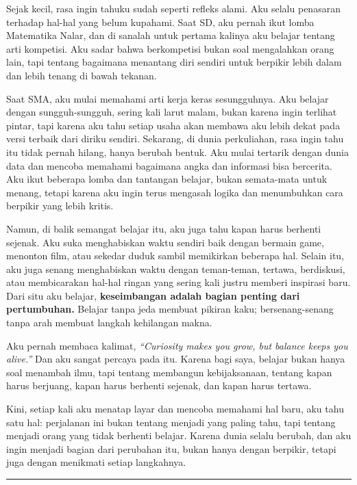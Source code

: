 \documentclass[
  letterpaper,
  DIV=11,
  numbers=noendperiod]{scrreprt}
\begin{document}
Sejak kecil, rasa ingin tahuku sudah seperti refleks alami. Aku selalu
penasaran terhadap hal-hal yang belum kupahami. Saat SD, aku pernah ikut
lomba Matematika Nalar, dan di sanalah untuk pertama kalinya aku belajar
tentang arti kompetisi. Aku sadar bahwa berkompetisi bukan soal
mengalahkan orang lain, tapi tentang bagaimana menantang diri sendiri
untuk berpikir lebih dalam dan lebih tenang di bawah tekanan.

Saat SMA, aku mulai memahami arti kerja keras sesungguhnya. Aku belajar
dengan sungguh-sungguh, sering kali larut malam, bukan karena ingin
terlihat pintar, tapi karena aku tahu setiap usaha akan membawa aku
lebih dekat pada versi terbaik dari diriku sendiri. Sekarang, di dunia
perkuliahan, rasa ingin tahu itu tidak pernah hilang, hanya berubah
bentuk. Aku mulai tertarik dengan dunia data dan mencoba memahami
bagaimana angka dan informasi bisa bercerita. Aku ikut beberapa lomba
dan tantangan belajar, bukan semata-mata untuk menang, tetapi karena aku
ingin terus mengasah logika dan menumbuhkan cara berpikir yang lebih
kritis.

Namun, di balik semangat belajar itu, aku juga tahu kapan harus berhenti
sejenak. Aku suka menghabiskan waktu sendiri baik dengan bermain game,
menonton film, atau sekedar duduk sambil memikirkan beberapa hal. Selain
itu, aku juga senang menghabiskan waktu dengan teman-teman, tertawa,
berdiskusi, atau membicarakan hal-hal ringan yang sering kali justru
memberi inspirasi baru. Dari situ aku belajar, \textbf{keseimbangan
adalah bagian penting dari pertumbuhan.} Belajar tanpa jeda membuat
pikiran kaku; bersenang-senang tanpa arah membuat langkah kehilangan
makna.

Aku pernah membaca kalimat, \emph{``Curiosity makes you grow, but
balance keeps you alive.''} Dan aku sangat percaya pada itu. Karena bagi
saya, belajar bukan hanya soal menambah ilmu, tapi tentang membangun
kebijaksanaan, tentang kapan harus berjuang, kapan harus berhenti
sejenak, dan kapan harus tertawa.

Kini, setiap kali aku menatap layar dan mencoba memahami hal baru, aku
tahu satu hal: perjalanan ini bukan tentang menjadi yang paling tahu,
tapi tentang menjadi orang yang tidak berhenti belajar. Karena dunia
selalu berubah, dan aku ingin menjadi bagian dari perubahan itu, bukan
hanya dengan berpikir, tetapi juga dengan menikmati setiap langkahnya.

\begin{center}\rule{0.5\linewidth}{0.5pt}\end{center}
\end{document}
